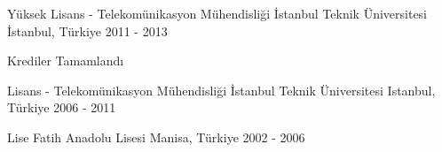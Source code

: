 

\begin{cventries}

  \cventry
    {Yüksek Lisans - Telekomünikasyon Mühendisliği} %
    {İstanbul Teknik Üniversitesi} %
    {İstanbul, Türkiye} %
    {2011 - 2013} %
    {
      \begin{cvitems} %
        \item {Krediler Tamamlandı}
      \end{cvitems}
    }

  \cventry
    {Lisans - Telekomünikasyon Mühendisliği} %
    {İstanbul Teknik Üniversitesi} %
    {Istanbul, Türkiye} %
    {2006 - 2011} %
    {}

  \cventry
    {Lise} %
    {Fatih Anadolu Lisesi} %
    {Manisa, Türkiye} %
    {2002 - 2006} %
    {}

\end{cventries}
